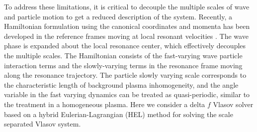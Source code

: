  To address these limitations, %
it is critical
 to decouple the multiple scales of wave and particle motion to get a reduced description of the system. 
Recently, a Hamiltonian formulation  using the canonical coordinates and momenta has been developed in the reference frames moving at local resonant velocities \cite{zheng2023a}.
The wave phase is expanded about the local resonance center, which effectively decouples  the multiple scales.
The Hamiltonian consists of 
the fast-varying wave particle interaction terms
and 
the slowly-varying terms in the resonance frame moving along the resonance trajectory. 
The particle slowly varying scale corresponds to the characteristic length of background plasma inhomogeneity, and the angle variable in the fast varying dynamics %
can be treated as quasi-periodic,
similar to the treatment in a homogeneous plasma.
Here we consider a delta $f$ Vlasov solver based on a hybrid Eulerian-Lagrangian (HEL) method  \cite{shiroto2022} for solving the scale separated Vlasov system.
